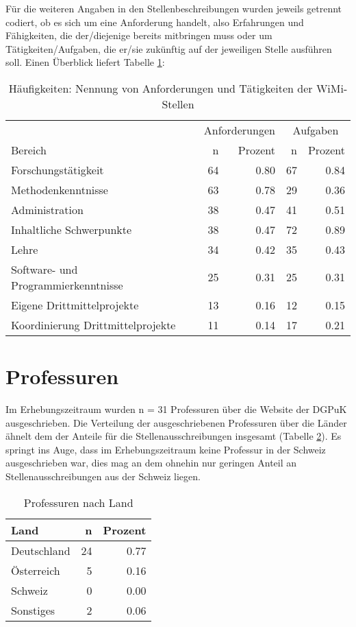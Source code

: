 \documentclass[
]{article}
\begin{document}
Für die weiteren Angaben in den Stellenbeschreibungen wurden jeweils getrennt codiert, ob es sich um eine Anforderung handelt, also Erfahrungen und Fähigkeiten, die der/diejenige bereits mitbringen muss oder um Tätigkeiten/Aufgaben, die er/sie zukünftig auf der jeweiligen Stelle ausführen soll. Einen Überblick liefert Tabelle \ref{tab:wimitasks}:

\begin{table}[H]

\caption{\label{tab:wimitasks}Häufigkeiten: Nennung von Anforderungen und Tätigkeiten der WiMi-Stellen}
\centering
\begin{tabular}[t]{l|r|r|r|r}
\hline
\multicolumn{1}{c|}{ } & \multicolumn{2}{c|}{Anforderungen} & \multicolumn{2}{c}{Aufgaben} \\
\cline{2-3} \cline{4-5}
Bereich & n & Prozent & n  & Prozent \\
\hline
Forschungstätigkeit & 64 & 0.80 & 67 & 0.84\\
\hline
Methodenkenntnisse & 63 & 0.78 & 29 & 0.36\\
\hline
Administration & 38 & 0.47 & 41 & 0.51\\
\hline
Inhaltliche Schwerpunkte & 38 & 0.47 & 72 & 0.89\\
\hline
Lehre & 34 & 0.42 & 35 & 0.43\\
\hline
Software- und Programmierkenntnisse & 25 & 0.31 & 25 & 0.31\\
\hline
Eigene Drittmittelprojekte & 13 & 0.16 & 12 & 0.15\\
\hline
Koordinierung Drittmittelprojekte & 11 & 0.14 & 17 & 0.21\\
\hline
\end{tabular}
\end{table}

\hypertarget{professuren}{%
\section{Professuren}\label{professuren}}

Im Erhebungszeitraum wurden n = 31 Professuren über die Website der DGPuK ausgeschrieben. Die Verteilung der ausgeschriebenen Professuren über die Länder ähnelt dem der Anteile für die Stellenausschreibungen insgesamt (Tabelle \ref{tab:profland}). Es springt ins Auge, dass im Erhebungszeitraum keine Professur in der Schweiz ausgeschrieben war, dies mag an dem ohnehin nur geringen Anteil an Stellenausschreibungen aus der Schweiz liegen.

\begin{table}[H]

\caption{\label{tab:profland}Professuren nach Land}
\centering
\begin{tabular}[t]{l|r|r}
\hline
Land & n & Prozent\\
\hline
Deutschland & 24 & 0.77\\
\hline
Österreich & 5 & 0.16\\
\hline
Schweiz & 0 & 0.00\\
\hline
Sonstiges & 2 & 0.06\\
\hline
\end{tabular}
\end{table}
\end{document}
